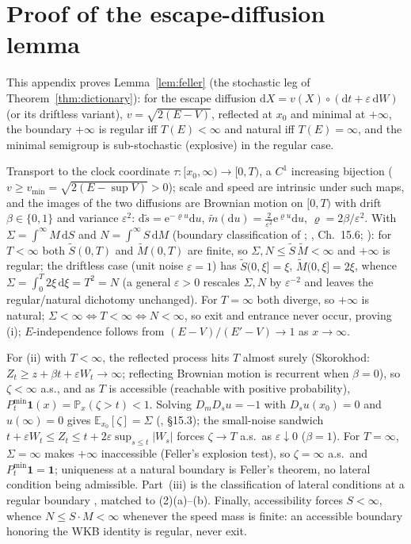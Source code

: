 \documentclass[11pt]{article}
\theoremstyle{definition}
\theoremstyle{remark}
\newcommand{\dd}{\mathrm{d}}
\newcommand{\ee}{\mathrm{e}}
\newcommand{\Prob}{\mathbb{P}}
\newcommand{\EE}{\mathbb{E}}
\begin{document}
\appendix

\section{Proof of the escape-diffusion lemma}
\label{app:feller}

This appendix proves Lemma~\ref{lem:feller} (the stochastic leg of
Theorem~\ref{thm:dictionary}): for the escape diffusion
$\dd X=v(X)\circ(\dd t+\varepsilon\,\dd W)$ (or its driftless variant),
$v=\sqrt{2(E-V)}$, reflected at $x_{0}$ and minimal at $+\infty$, the
boundary $+\infty$ is regular iff $T(E)<\infty$ and natural iff
$T(E)=\infty$, and the minimal semigroup is sub-stochastic (explosive) in
the regular case.

Transport to the clock coordinate $\tau:[x_{0},\infty)\to[0,T)$, a $C^{1}$
increasing bijection ($v\ge v_{\min}=\sqrt{2(E-\sup V)}>0$); scale and speed
are intrinsic under such maps, and the images of the two diffusions are
Brownian motion on $[0,T)$ with drift $\beta\in\{0,1\}$ and variance
$\varepsilon^{2}$: $\dd\tilde s=\ee^{-\varrho u}\dd u$,
$\tilde m(\dd u)=\tfrac{2}{\varepsilon^{2}}\ee^{\varrho u}\dd u$,
$\varrho=2\beta/\varepsilon^{2}$. With
$\Sigma=\int^{\infty}M\,\dd S$ and $N=\int^{\infty}S\,\dd M$ (boundary
classification of \cite{Feller1952,Feller1957}; \cite{KarlinTaylor},
Ch.~15.6; \cite{ItoMcKean}): for $T<\infty$ both $\tilde S(0,T)$ and
$\tilde M(0,T)$ are finite, so $\Sigma,N\le\tilde S\,\tilde M<\infty$ and
$+\infty$ is regular; the driftless case (unit noise $\varepsilon=1$) has $\tilde S(0,\xi]=\xi$,
$\tilde M(0,\xi]=2\xi$, whence $\Sigma=\int_{0}^{T}2\xi\,\dd\xi=T^{2}=N$
(a general $\varepsilon>0$ rescales $\Sigma,N$ by $\varepsilon^{-2}$ and
leaves the regular/natural dichotomy unchanged). For
$T=\infty$ both diverge, so $+\infty$ is natural; $\Sigma<\infty\Leftrightarrow
T<\infty\Leftrightarrow N<\infty$, so exit and entrance never occur, proving
(i); $E$-independence follows from $(E-V)/(E'-V)\to1$ as $x\to\infty$.

For (ii) with $T<\infty$, the reflected process hits $T$ almost surely
(Skorokhod: $Z_{t}\ge z+\beta t+\varepsilon W_{t}\to\infty$; reflecting
Brownian motion is recurrent when $\beta=0$), so $\zeta<\infty$ a.s., and as
$T$ is accessible (reachable with positive probability),
$P^{\min}_{t}\mathbf 1(x)=\Prob_{x}(\zeta>t)<1$. Solving $D_{m}D_{s}u=-1$
with $D_{s}u(x_{0})=0$ and $u(\infty)=0$ gives
$\EE_{x_{0}}[\zeta]=\Sigma$ (\cite{KarlinTaylor}, \S15.3); the small-noise
sandwich $t+\varepsilon W_{t}\le Z_{t}\le t+2\varepsilon\sup_{s\le t}|W_{s}|$
forces $\zeta\to T$ a.s.\ as $\varepsilon\downarrow0$ ($\beta=1$). For $T=\infty$, $\Sigma=\infty$ makes $+\infty$
inaccessible (Feller's explosion test), so $\zeta=\infty$ a.s.\ and
$P^{\min}_{t}\mathbf 1=\mathbf 1$; uniqueness at a natural boundary is
Feller's theorem, no lateral condition being admissible. Part~(iii) is the
classification of lateral conditions at a regular boundary
\cite{Feller1957,ItoMcKean}, matched to (2)(a)--(b). Finally, accessibility
forces $S<\infty$, whence $N\le S\cdot M<\infty$ whenever the speed mass is
finite: an accessible boundary honoring the WKB identity is regular, never
exit.
\end{document}
